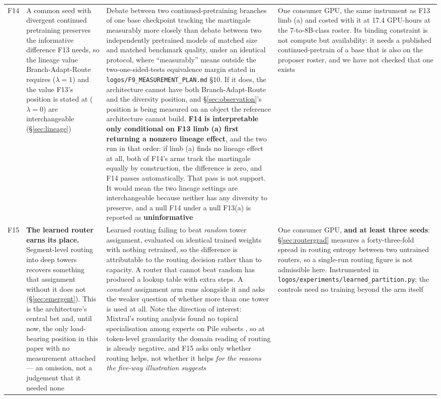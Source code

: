 \documentclass[11pt]{article}
\begin{document}
\begin{longtable}{@{}p{}p{}p{}p{}@{}}
F14 & A common seed with divergent continued pretraining preserves the informative difference F13 needs, so the lineage value Branch-Adapt-Route requires ($\lambda = 1$) and the value F13's position is stated at ($\lambda = 0$) are interchangeable (\S\ref{sec:lineage}) & Debate between two continued-pretraining branches of one base checkpoint tracking the martingale measurably more closely than debate between two independently pretrained models of matched size and matched benchmark quality, under an identical protocol, where ``measurably'' means outside the two-one-sided-tests equivalence margin stated in \texttt{logos/}\allowbreak\texttt{F9\_MEASUREMENT\_PLAN.md} \S10. If it does, the architecture cannot have both Branch-Adapt-Route and the diversity position, and \S\ref{sec:observation}'s position is being measured on an object the reference architecture cannot build. \textbf{F14 is interpretable only conditional on F13 limb (a) first returning a nonzero lineage effect}, and the two run in that order: if limb (a) finds no lineage effect at all, both of F14's arms track the martingale equally by construction, the difference is zero, and F14 passes automatically. That pass is not support. It would mean the two lineage settings are interchangeable because neither has any diversity to preserve, and a null F14 under a null F13(a) is reported as \textbf{uninformative} & One consumer GPU, the same instrument as F13 limb (a) and costed with it at 17.4 GPU-hours at the 7-to-8B-class roster. Its binding constraint is not compute but availability: it needs a published continued-pretrain of a base that is also on the proposer roster, and we have not checked that one exists \\
\addlinespace
F15 & \textbf{The learned router earns its place.} Segment-level routing into deep towers recovers something that assignment without it does not (\S\ref{sec:emergent}). This is the architecture's central bet and, until now, the only load-bearing position in this paper with no measurement attached --- an omission, not a judgement that it needed none & Learned routing failing to beat \emph{random} tower assignment, evaluated on identical trained weights with nothing retrained, so the difference is attributable to the routing decision rather than to capacity. A router that cannot beat random has produced a lookup table with extra steps. A \emph{constant} assignment arm runs alongside it and asks the weaker question of whether more than one tower is used at all. Note the direction of interest: Mixtral's routing analysis found no topical specialisation among experts on Pile subsets \cite{jiang2024mixtral}, so at token-level granularity the domain reading of routing is already negative, and F15 asks only whether routing helps, not whether it helps \emph{for the reasons the five-way illustration suggests} & One consumer GPU, \textbf{and at least three seeds}: \S\ref{sec:routergrad} measures a forty-three-fold spread in routing entropy between two untrained routers, so a single-run routing figure is not admissible here. Instrumented in \texttt{logos/experiments/}\allowbreak\texttt{learned\_partition.py}; the controls need no training beyond the arm itself \\

\end{longtable}
\end{document}

